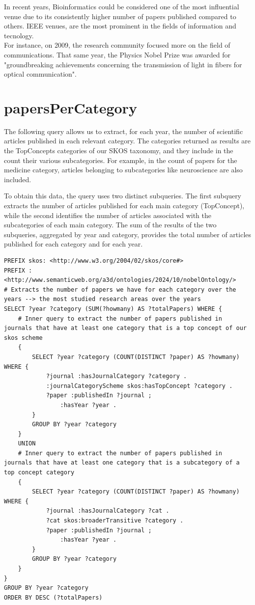 \documentclass{article}
\begin{document}
In recent years, Bioinformatics could be considered one of the most influential
venue due to its consistently higher number of papers published compared to others.
IEEE venues, are the most prominent in the fields of information and tecnology.\\
For instance, on 2009, the research community focused more on the field of
communications.
That same year, the Physics Nobel Prize was awarded for "groundbreaking achievements
concerning the transmission of light in fibers for optical communication".

\section{papersPerCategory}
The following query allows us to extract, for each year, the number of scientific articles published in each relevant category. The categories returned
as results are the TopConcepts categories of our SKOS taxonomy, and they include in the count their various subcategories. For example, in the count
of papers for the medicine category, articles belonging to subcategories like neuroscience are also included.

\noindent To obtain this data, the query uses two distinct subqueries. The first subquery extracts the number of articles published for each main category
(TopConcept), while the second identifies the number of articles associated with the subcategories of each main category. The sum of the results of
the two subqueries, aggregated by year and category, provides the total number of articles published for each category and for each year.

\begin{lstlisting}
PREFIX skos: <http://www.w3.org/2004/02/skos/core#>
PREFIX : <http://www.semanticweb.org/a3d/ontologies/2024/10/nobelOntology/>
# Extracts the number of papers we have for each category over the years --> the most studied research areas over the years
SELECT ?year ?category (SUM(?howmany) AS ?totalPapers) WHERE {
    # Inner query to extract the number of papers published in journals that have at least one category that is a top concept of our skos scheme
    {
        SELECT ?year ?category (COUNT(DISTINCT ?paper) AS ?howmany) WHERE {
            ?journal :hasJournalCategory ?category .
            :journalCategoryScheme skos:hasTopConcept ?category .
            ?paper :publishedIn ?journal ;
                :hasYear ?year .
        }
        GROUP BY ?year ?category
    }
    UNION
    # Inner query to extract the number of papers published in journals that have at least one category that is a subcategory of a top concept category
    {
        SELECT ?year ?category (COUNT(DISTINCT ?paper) AS ?howmany) WHERE {
            ?journal :hasJournalCategory ?cat .
            ?cat skos:broaderTransitive ?category .
            ?paper :publishedIn ?journal ;
                :hasYear ?year .
        }
        GROUP BY ?year ?category
    }
}
GROUP BY ?year ?category
ORDER BY DESC (?totalPapers)
\end{lstlisting}
\end{document}
